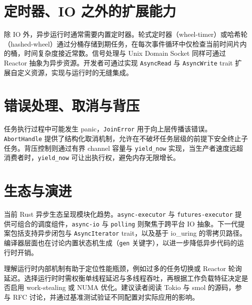 \chapter{定时器、IO 之外的扩展能力}
除 IO 外，异步运行时通常需要内置定时器。轮式定时器（wheel-timer）或哈希轮（hashed-wheel）通过分桶存储到期任务，在每次事件循环中仅检查当前时间片内的桶，时间复杂度接近常数。信号处理与 Unix Domain Socket 同样可通过 Reactor 抽象为异步资源。开发者可通过实现 \texttt{AsyncRead} 与 \texttt{AsyncWrite} trait 扩展自定义资源，实现与运行时的无缝集成。\par
\chapter{错误处理、取消与背压}
任务执行过程中可能发生 panic，\texttt{JoinError} 用于向上层传播该错误。\texttt{AbortHandle} 提供了结构化取消机制，允许在不破坏任务层级的前提下安全终止子任务。背压控制则通过有界 channel 容量与 \texttt{yield\_{}now} 实现，当生产者速度远超消费者时，\texttt{yield\_{}now} 可让出执行权，避免内存无限增长。\par
\chapter{生态与演进}
当前 Rust 异步生态呈现模块化趋势。\texttt{async-executor} 与 \texttt{futures-executor} 提供可组合的调度组件，\texttt{async-io} 与 \texttt{polling} 则聚焦于跨平台 IO 抽象。下一代提案包括支持异步闭包与 \texttt{AsyncIterator} trait，以及基于 io\_{}uring 的零拷贝路径。编译器层面也在讨论内置状态机生成（\texttt{gen} 关键字），以进一步降低异步代码的运行时开销。\par
理解运行时内部机制有助于定位性能瓶颈，例如过多的任务切换或 Reactor 轮询延迟。选择运行时时需权衡单线程延迟与多线程吞吐，再根据工作负载特征决定是否启用 work-stealing 或 NUMA 优化。建议读者阅读 Tokio 与 smol 的源码，参与 RFC 讨论，并通过基准测试验证不同配置对实际应用的影响。\par
